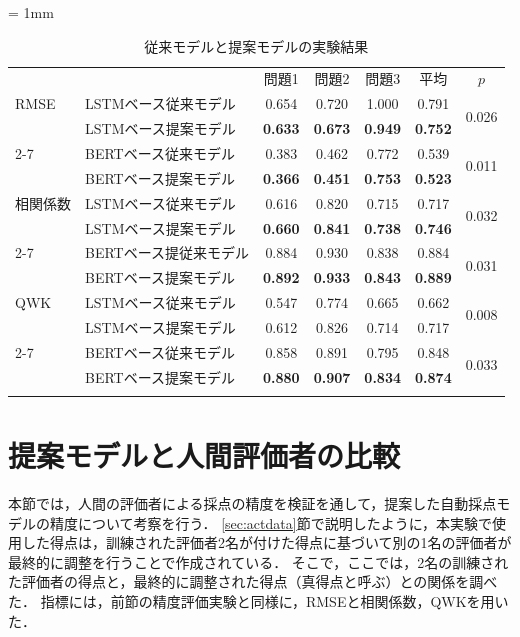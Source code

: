 \documentclass[a4paper,12pt,oneside,openany]{jsbook}
\newcommand{\bhline}[1]{\noalign{\hrule height #1}}
\begin{document}
\begin{table}[t]
\tabcolsep = 1mm
\center
\caption{従来モデルと提案モデルの実験結果}
\label{tb:result}
\begin{tabular}{ll ccc cc}
\bhline{1pt}
 &  & 問題1 & 問題2 & 問題3 & $平均$ & $p$ \\
\bhline{1pt}
RMSE & LSTMベース従来モデル & 0.654 & 0.720 & 1.000 & 0.791 &  \multirow{2}{*}{0.026} \\
 & LSTMベース提案モデル &\bf 0.633 &\bf 0.673 &\bf 0.949 &\bf 0.752 & \\
 \cline{2-7}
 & BERTベース従来モデル & 0.383 & 0.462 & 0.772 & 0.539 & \multirow{2}{*}{0.011}  \\
 & BERTベース提案モデル &\bf 0.366 &\bf 0.451 &\bf 0.753 &\bf 0.523  \\
\hline
相関係数 & LSTMベース従来モデル & 0.616 & 0.820 & 0.715 & 0.717 & \multirow{2}{*}{0.032}  \\
 & LSTMベース提案モデル &\bf 0.660 &\bf 0.841 &\bf 0.738 &\bf 0.746  \\
 \cline{2-7}
 & BERTベース提従来モデル & 0.884 & 0.930 & 0.838 & 0.884 & \multirow{2}{*}{0.031} \\
 & BERTベース提案モデル &\bf 0.892 &\bf 0.933 &\bf 0.843 &\bf 0.889 \\
\hline
QWK & LSTMベース従来モデル & 0.547 & 0.774 & 0.665 & 0.662 &  \multirow{2}{*}{0.008} \\
 & LSTMベース提案モデル & 0.612 & 0.826 & 0.714 & 0.717 & \\
 \cline{2-7}
 & BERTベース従来モデル & 0.858 & 0.891 & 0.795 & 0.848 & \multirow{2}{*}{0.033}  \\
 & BERTベース提案モデル &\bf 0.880 &\bf 0.907 &\bf 0.834 &\bf 0.874  \\
\bhline{1pt}
\end{tabular}
\end{table}

\section{提案モデルと人間評価者の比較}


本節では，人間の評価者による採点の精度を検証を通して，提案した自動採点モデルの精度について考察を行う．
\ref{sec:actdata}節で説明したように，本実験で使用した得点は，訓練された評価者2名が付けた得点に基づいて別の1名の評価者が最終的に調整を行うことで作成されている．
そこで，ここでは，2名の訓練された評価者の得点と，最終的に調整された得点（真得点と呼ぶ）との関係を調べた．
指標には，前節の精度評価実験と同様に，RMSEと相関係数，QWKを用いた．
\end{document}
